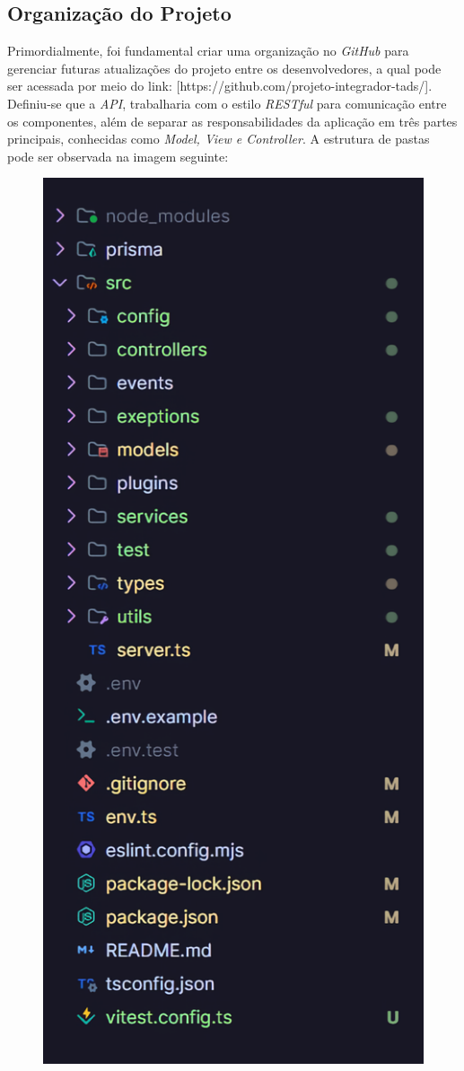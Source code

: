 \subsection{Organização do Projeto}

Primordialmente, foi fundamental criar uma organização no \textit{ GitHub} para gerenciar futuras atualizações do projeto entre os desenvolvedores, a qual pode ser acessada por meio do link: [https://github.com/projeto-integrador-tads/]. Definiu-se que a \textit{API}, trabalharia com o estilo \textit{RESTful} para comunicação entre os componentes, além de separar as responsabilidades da aplicação em três partes principais, conhecidas como \textit{Model, View e Controller}. A estrutura de pastas pode ser observada na imagem seguinte:


\begin{figure} [h!]
	\centering
	\includegraphics[scale=0.3]{img/pastas.png}

\end{figure}
